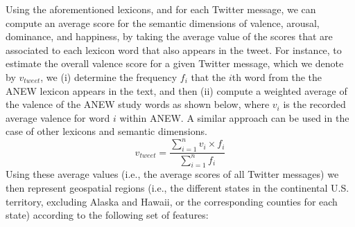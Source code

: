 \documentclass{acm_proc_article-sp}
\begin{document}
Using the aforementioned lexicons, and for each Twitter message, we can compute an average score for the semantic dimensions of valence, arousal, dominance, and happiness, by taking the average value of the scores that are associated to each lexicon word that also appears in the tweet. For instance, to estimate the overall valence score for a given Twitter message, which we denote by $v_{tweet}$, we (i) determine the frequency $f_i$ that the $i$th word from the the ANEW lexicon appears in the text, and then (ii) compute a weighted average of the valence of the ANEW study words as shown below, where $v_i$ is the recorded average valence for word $i$ within ANEW. A similar approach can be used in the case of other lexicons and semantic dimensions.
\begin{equation}
v_{tweet} = \frac{\sum_{i=1}^n v_i \times f_i}{\sum_{i=1}^n f_i}
\end{equation}
Using these average values (i.e., the average scores of all Twitter messages) we then represent geospatial regions (i.e., the different states in the continental U.S. territory, excluding Alaska and Hawaii, or the corresponding counties for each state) according to the following set of features:
\end{document}
